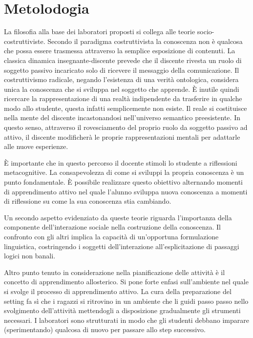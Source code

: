 \documentclass[12pt]{article}
\begin{document}
%
%
\section{Metolodogia}
La filosofia alla base dei laboratori proposti si collega alle teorie socio-costruttiviste. Secondo il paradigma costruttivista la conoscenza non è qualcosa che possa essere trasmessa attraverso la semplice esposizione di contenuti. La classica dinamica insegnante-discente prevede che il discente rivesta un ruolo di soggetto passivo incaricato solo di ricevere il messaggio della comunicazione. Il costruttivismo radicale, negando l'esistenza di una verità ontologica, considera unica la conoscenza che si sviluppa nel soggetto che apprende. È inutile quindi ricercare la rappresentazione di una realtà indipendente da trasferire in qualche modo allo studente, questa infatti semplicemente non esiste. Il reale si costituisce nella mente del discente incastonandosi nell'universo semantico preesistente. In questo senso, attraverso il rovesciamento del proprio ruolo da soggetto passivo ad attivo, il discente modificherà le proprie rappresentazioni mentali per adattarle alle nuove esperienze.

È importante che in questo percorso il docente stimoli lo studente a riflessioni metacognitive. La consapevolezza di come si sviluppi la propria conoscenza è un punto fondamentale. È possibile realizzare questo obiettivo alternando momenti di apprendimento attivo nel quale l'alunno sviluppa nuova conoscenza a momenti di riflessione su come la sua conoscenza stia cambiando.

Un secondo aspetto evidenziato da queste teorie riguarda l'importanza della componente dell'interazione sociale nella costruzione della conoscenza. Il confronto con gli altri implica la capacità di un'opportuna formulazione linguistica, costringendo i soggetti dell'interazione all'esplicitazione di passaggi logici non banali.

Altro punto tenuto in considerazione nella pianificazione delle attività è il concetto di apprendimento allosterico. Si pone forte enfasi sull'ambiente nel quale si svolge il processo di apprendimento attivo. La cura della preparazione del setting fa sì che i ragazzi si ritrovino in un ambiente che li guidi passo passo nello svolgimento dell'attività mettendogli a disposizione gradualmente gli strumenti necessari. I laboratori sono strutturati in modo che gli studenti debbano imparare (sperimentando) qualcosa di nuovo per passare allo step successivo.
\end{document}
